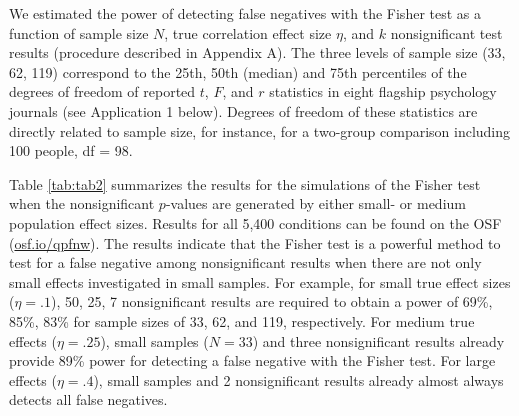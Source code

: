 \documentclass{article}
\begin{document}
We estimated the power of detecting false negatives with the Fisher test as a function of sample size $N$, true correlation effect size $\eta$, and $k$ nonsignificant test results (procedure described in Appendix A). The three levels of sample size (33, 62, 119) correspond to the  25th, 50th (median) and 75th percentiles of the degrees of freedom of reported $t$, $F$, and $r$ statistics in eight flagship psychology journals (see Application 1 below). Degrees of freedom of these statistics are directly related to sample size, for instance, for a two-group comparison including 100 people, df = 98. 

Table \ref{tab:tab2} summarizes the results for the simulations of the Fisher test when the nonsignificant $p$-values are generated by either small- or medium population effect sizes. Results for all 5,400 conditions can be found on the OSF (\url{osf.io/qpfnw}). The results indicate that the Fisher test is a powerful method to test for a false negative among nonsignificant results when there are not only small effects investigated in small samples. For example, for small true effect sizes ($\eta=.1$), 50, 25, 7 nonsignificant results are required to obtain a power of 69\%, 85\%, 83\% for sample sizes of 33, 62, and 119, respectively. For medium true effects ($\eta=.25$), small samples ($N=33$) and three nonsignificant results already provide 89\% power for detecting a false negative with the Fisher test. For large effects ($\eta=.4$), small samples and 2 nonsignificant results already almost always detects all false negatives.
\end{document}
